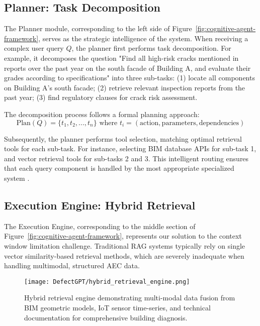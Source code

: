 \subsection{Planner: Task Decomposition}

The Planner module, corresponding to the left side of Figure~\ref{fig:cognitive-agent-framework}, serves as the strategic intelligence of the system. When receiving a complex user query $Q$, the planner first performs task decomposition. For example, it decomposes the question "Find all high-risk cracks mentioned in reports over the past year on the south facade of Building A, and evaluate their grades according to specifications" into three sub-tasks: (1) locate all components on Building A's south facade; (2) retrieve relevant inspection reports from the past year; (3) find regulatory clauses for crack risk assessment.

The decomposition process follows a formal planning approach:
\begin{equation}
\text{Plan}(Q) = \{t_1, t_2, ..., t_n\} \text{ where } t_i = (\text{action}, \text{parameters}, \text{dependencies})
\end{equation}

Subsequently, the planner performs tool selection, matching optimal retrieval tools for each sub-task. For instance, selecting BIM database APIs for sub-task 1, and vector retrieval tools for sub-tasks 2 and 3. This intelligent routing ensures that each query component is handled by the most appropriate specialized system \cite{yao2022react}.

\subsection{Execution Engine: Hybrid Retrieval}

The Execution Engine, corresponding to the middle section of Figure~\ref{fig:cognitive-agent-framework}, represents our solution to the context window limitation challenge. Traditional RAG systems typically rely on single vector similarity-based retrieval methods, which are severely inadequate when handling multimodal, structured AEC data.

\begin{figure}[htbp]
\centering
\texttt{[image: DefectGPT/hybrid\_retrieval\_engine.png]}
\caption{Hybrid retrieval engine demonstrating multi-modal data fusion from BIM geometric models, IoT sensor time-series, and technical documentation for comprehensive building diagnosis.}
\label{fig:hybrid-retrieval-engine}
\end{figure}

